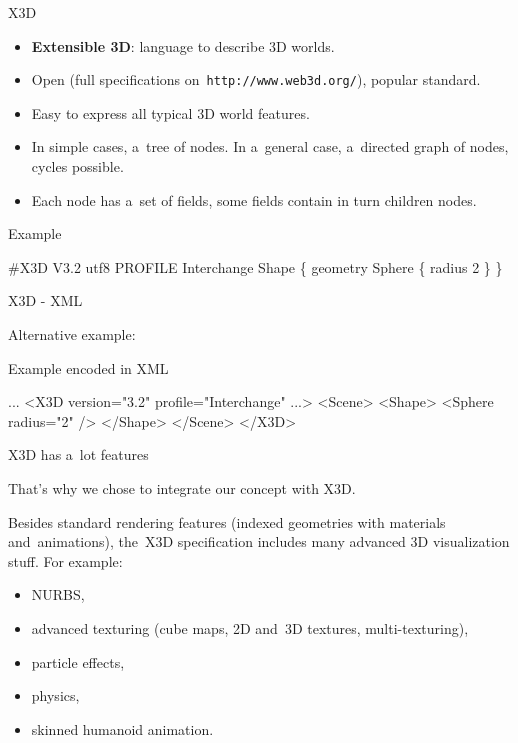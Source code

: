 \documentclass{beamer}
\begin{document}
\begin{frame}[fragile]{X3D}

\begin{itemize}
  \item \textbf{Extensible 3D}: language to describe 3D worlds.
  \item Open (full specifications on~\texttt{http://www.web3d.org/}), popular standard.
  \item Easy to express all typical 3D world features.
  \item In simple cases, a~tree of nodes.
    In a~general case, a~directed graph of nodes, cycles possible.
  \item Each node has a~set of fields, some fields contain in turn children nodes.
\end{itemize}

\begin{exampleblock}{Example}
\begin{semiverbatim}
\#X3D V3.2 utf8
PROFILE Interchange
Shape \{
  geometry Sphere \{ radius 2 \}
\}
\end{semiverbatim}
\end{exampleblock}
\end{frame}

\begin{frame}[fragile]{X3D - XML}

Alternative example:

\begin{exampleblock}{Example encoded in XML}
\begin{semiverbatim}
...
<X3D version="3.2" profile="Interchange" ...>
  <Scene>
    <Shape>
      <Sphere radius="2" />
    </Shape>
  </Scene>
</X3D>
\end{semiverbatim}
\end{exampleblock}

\end{frame}

\begin{frame}{X3D has a~lot features}

That's why we chose to integrate our concept with X3D.

Besides standard rendering features (indexed geometries with materials
and~animations), the~X3D specification includes many
advanced 3D visualization stuff. For example:

\begin{itemize}
  \item NURBS,
  \item advanced texturing (cube maps, 2D and~3D textures, multi-texturing),
  \item particle effects,
  \item physics,
  \item skinned humanoid animation.
\end{itemize}
\end{frame}
\end{document}
